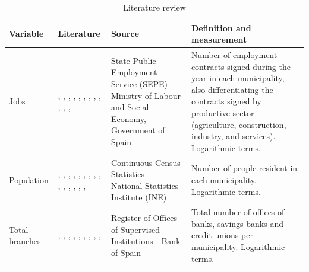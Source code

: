 \documentclass[a4paper,11pt,oneside]{article}
\renewcommand{\baselinestretch}{1.5}
\renewcommand{\baselinestretch}{1.33}
\begin{document}
{\pagebreak
\clearpage




\begin{table}
\footnotesize
\renewcommand{\baselinestretch}{1}
\caption{Literature review}
\centering
\label{tbl:literature_review}
\begin{tabular}{llll}
\toprule
Variable           & Literature                                   & Source           & Definition and measurement                 \\
\midrule
\parbox[c]{20mm}{ Jobs}               & \parbox[c]{77mm}{ \cite{carlino1987determinants}, \cite{boarnet1994empirical}, \cite{feser2006harnessing}, \cite{de2012regional}, \cite{de2012sectoral}, \cite{hoogstra2012gender}, \cite{hegerty2016commercial}, \cite{hoogstra2017jobs}, \cite{collantes2019lugares}, \cite{nguyen2019credit}, \cite{bandres2021despoblacion}, \cite{coccorese2021cooperative}, \cite{carbo2023geographical}}    & \parbox[c]{45mm}{ State Public Employment Service (SEPE) - Ministry of Labour and Social Economy, Government of Spain }                                           & \parbox[c]{76mm}{ Number of employment contracts signed during the year in each municipality, also differentiating the contracts signed by productive sector (agriculture, construction, industry, and services). Logarithmic terms.}
\\
\cmidrule(r){2-4}
\parbox[c]{20mm}{Population}         & \parbox[c]{77mm}{ \cite{carlino1987determinants}, \cite{boarnet1994empirical,boarnet1994monocentric}, \cite{feser2006harnessing}, \cite{kubrin2011does}, \cite{de2012regional,de2012sectoral},  \cite{hoogstra2012gender}, \cite{hegerty2016commercial}, \cite{hoogstra2017jobs}, \cite{kashian2018bank}, \cite{bernini2018bank}, \cite{nguyen2019credit}, \cite{hasan2019economic}, \cite{hegerty2020banking}, \cite{mishura2020providing}, \cite{hegerty2021bank}, \cite{carbo2023geographical} }& \parbox[c]{45mm}{ Continuous Census Statistics - National Statistics Institute (INE)  }      & \parbox[c]{76mm}{ Number of people resident in each municipality. Logarithmic terms.}       \\
\cmidrule(r){2-4}
\parbox[c]{20mm}{Total branches}     & \parbox[c]{77mm}{ \cite{degryse2005distance}, \cite{gilje2016exporting}, \cite{bernini2018bank}, \cite{nguyen2019credit}, \cite{hasan2019economic}, \cite{hegerty2020banking}, \cite{mishura2020providing}, \cite{goerlich2021distribucion}, \cite{hegerty2021bank}, \cite{carbo2023geographical}} & \parbox[c]{45mm}{ Register of Offices of Supervised Institutions - Bank of Spain }                  & \parbox[c]{76mm}{  Total number of offices of banks, savings banks and credit unions per municipality. Logarithmic terms.    }    \\

\end{tabular}
\end{table}}
\end{document}
